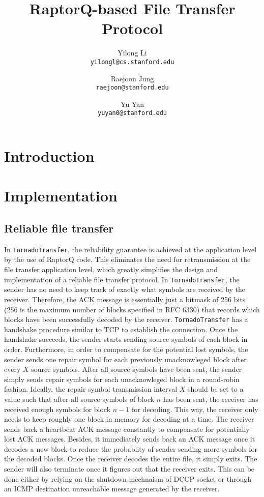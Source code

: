 \documentclass{sig-alternate-10pt}
\begin{document}
\title{RaptorQ-based File Transfer Protocol}
\author{
  Yilong Li\\
  \texttt{yilongl@cs.stanford.edu}
  \and 
  Raejoon Jung\\
  \texttt{raejoon@stanford.edu}
  \and
  Yu Yan\\
  \texttt{yuyan0@stanford.edu}
}

\maketitle
\section{Introduction}

\section{Implementation}

\subsection{Reliable file transfer}

In \texttt{TornadoTransfer}, the reliability guarantee is achieved at the application level by the use of RaptorQ code. This eliminates the need for retransmission at the file transfer application level, which greatly simplifies the design and implementation of a reliable file transfer protocol. In \texttt{TornadoTransfer}, the sender has no need to keep track of exactly what symbols are received by the receiver. Therefore, the ACK message is essentially just a bitmask of 256 bits (256 is the maximum number of blocks specified in RFC 6330) that records which blocks have been successfully decoded by the receiver. \texttt{TornadoTransfer} has a handshake procedure similar to TCP to establish the connection. Once the handshake succeeds, the sender starts sending source symbols of each block in order. Furthermore, in order to compensate for the potential lost symbols, the sender sends one repair symbol for each previously unacknowleged block after every $X$ source symbols. After all source symbols have been sent, the sender simply sends repair symbols for each unacknowleged block in a round-robin fashion. Ideally, the repair symbol transmission interval $X$ should be set to a value such that after all source symbols of block $n$ has been sent, the receiver has received enough symbols for block $n-1$ for decoding. This way, the receiver only needs to keep roughly one block in memory for decoding at a time. The receiver sends back a heartbeat ACK message constantly to compensate for potentially lost ACK messages. Besides, it immediately sends back an ACK message once it decodes a new block to reduce the probablity of sender sending more symbols for the decoded blocks. Once the receiver decodes the entire file, it simply exits. The sender will also terminate once it figures out that the receiver exits. This can be done either by relying on the shutdown mechnaism of DCCP socket or through an ICMP destination unreachable message generated by the receiver.
\end{document}
